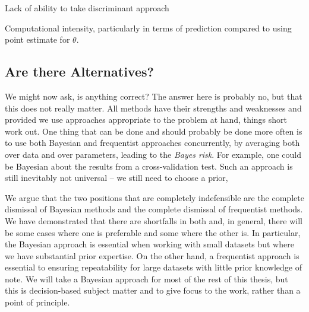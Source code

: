 Lack of ability to take discriminant approach

Computational intensity, particularly in terms of prediction compared to using point estimate for $\theta$.

\subsection{Are there Alternatives?}
\label{sec:bayes:religion:correct}


We might now ask, is anything correct?  The answer here is probably no, but that this does not really matter.  All methods
have their strengths and weaknesses and provided we use approaches appropriate to the problem at hand, things short work out.
One thing that can be done and should probably be done more often is to use both Bayesian and frequentist approaches concurrently,
by averaging both over data and over parameters, leading to the \emph{Bayes risk}.   For example, one could be Bayesian 
about the results from a cross-validation test.  Such an approach is still inevitably not universal -- we still need to choose
a prior, 

We argue that the two positions that are completely indefensible are the complete dismissal of Bayesian
methods and the complete dismissal of frequentist methods.  We have demonstrated that there are shortfalls
in both and, in general, there will be some cases where one is preferable and some where the other is.  In
particular, the Bayesian approach is essential when working with small datasets but where we have substantial
prior expertise.  On the other hand, a frequentist approach is essential to ensuring repeatability for large
datasets with little prior knowledge of note.  
We will take a Bayesian approach for most of the rest of this thesis, but this is decision-based subject matter and
to give focus to the work, rather than a point of principle.

